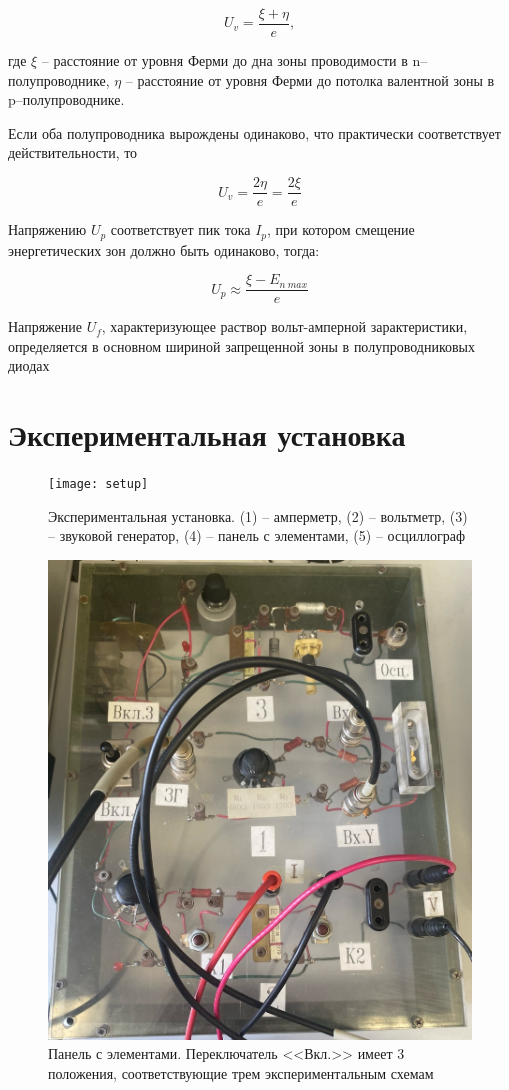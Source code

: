 \documentclass[a4paper,12pt]{article}
\begin{document}
$$
	U_v = \frac{\xi + \eta}{e},
$$ 

где $\xi$ -- расстояние от уровня Ферми до дна зоны проводимости в n--полупроводнике, $\eta$ -- расстояние от уровня Ферми до потолка валентной зоны в p--полупроводнике.

Если оба полупроводника вырождены одинаково, что практически соответствует действительности, то

$$
	U_v = \frac{2\eta}{e} = \frac{2\xi}{e}
$$ 

Напряжению $U_p$ соответствует пик тока $I_p$, при котором смещение энергетических зон должно быть одинаково, тогда:

$$
	U_p \approx \frac{\xi - E_{n \ max}}{e}
$$

Напряжение $U_f$, характеризующее раствор вольт-амперной зарактеристики, определяется в основном шириной запрещенной зоны в полупроводниковых диодах

\newpage

\section*{Экспериментальная установка}

\begin{figure}[h!]
	\centering
	\texttt{[image: setup]}
	\caption{Экспериментальная установка. (1) -- амперметр, (2) -- вольтметр, (3) -- звуковой генератор, (4) -- панель с элементами, (5) -- осциллограф}
\end{figure}

\begin{figure}[h!]
	\centering
	\includegraphics[scale=0.15]{plata}
	\caption{Панель с элементами. Переключатель <<Вкл.>> имеет 3 положения, соответствующие трем экспериментальным схемам}
\end{figure}
\end{document}

